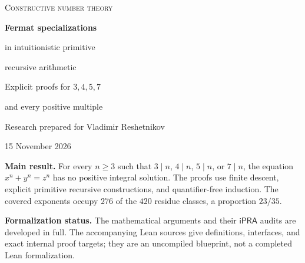 \documentclass[11pt,letterpaper]{article}
\newcommand{\ipra}{\mathsf{iPRA}}
\theoremstyle{remark}
\numberwithin{equation}{section}
\begin{document}
\hypersetup{pageanchor=false}
\begin{titlepage}
\centering
\vspace*{0.6in}
{\Large\scshape Constructive number theory\par}
\vspace{0.5in}
{\Huge\bfseries Fermat specializations\par}
\vspace{0.18in}
{\LARGE in intuitionistic primitive\par recursive arithmetic\par}
\vspace{0.4in}
{\Large Explicit proofs for $3,4,5,7$\par and every positive multiple\par}
\vspace{0.5in}
{\large Research prepared for Vladimir Reshetnikov\par}
\vspace{0.12in}
{\large 15 November 2026\par}
\vfill
\begin{minipage}{0.89\textwidth}
\textbf{Main result.} For every $n\geq3$ such that
$3\mid n$, $4\mid n$, $5\mid n$, or $7\mid n$, the equation
$x^n+y^n=z^n$ has no positive integral solution. The proofs use finite
descent, explicit primitive recursive constructions, and quantifier-free
induction. The covered exponents occupy $276$ of the $420$ residue
classes, a proportion $23/35$.

\medskip
\textbf{Formalization status.} The mathematical arguments and their
$\ipra$ audits are developed in full. The accompanying Lean sources give
definitions, interfaces, and exact internal proof targets; they are an
uncompiled blueprint, not a completed Lean formalization.
\end{minipage}
\vspace*{0.5in}
\end{titlepage}
\hypersetup{pageanchor=true}

\begin{abstract}
We give human-readable constructive proofs of Fermat's last theorem for
exponents $3$, $4$, $5$, and $7$, and prove uniformly that every positive
multiple of one of these exponents is covered. The quartic theorem is
strengthened to the impossibility of $x^4+y^4=z^2$. The cubic proof uses
explicit Eisenstein pairs; the quintic proof uses the golden quadratic
ring, including a bounded normalization of its infinitely many units; the
seventh-power proof uses an integer quartic descent with Lebesgue's
essential correction included. Each descent is converted to a finite
iteration or bounded Boolean induction. We specify the language, axioms,
decidable encodings, search bounds, and induction invariants needed by
intuitionistic primitive recursive arithmetic. Finally we give concrete
Lean definitions and a dependency plan targeting ProveIt's actual
\texttt{Prf PRAAx} derivations. Exact algebra checks support the
transcription; no finite experiment is presented as a proof of FLT, and
no completed Lean or internal proof certificate is claimed.
\end{abstract}
\end{document}

